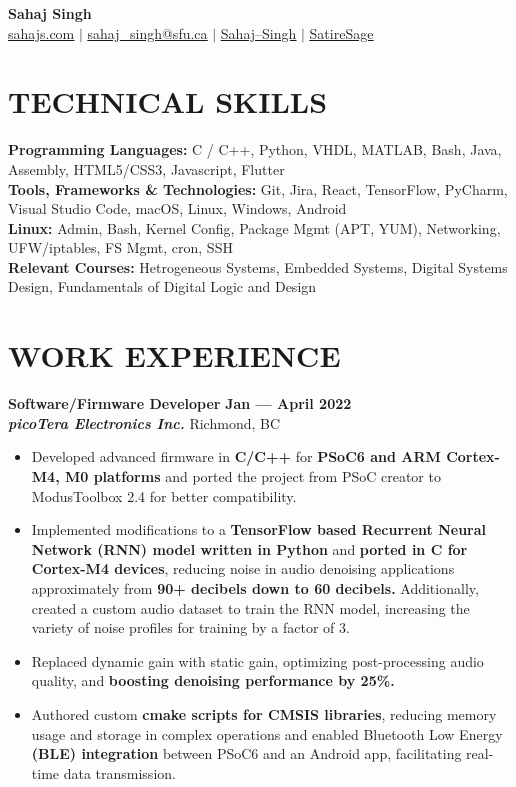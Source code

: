 \documentclass[letterpaper,11pt]{article}
\newcommand{\contact} [5] {
    \begin{center}
        \textbf{\color{colorValue}\Huge #1} \\ \vspace{1pt}
        \small \href{https://#2}{\faIcon{code} \underline{#2}} $|$ \href{mailto:#3}{\faIcon{envelope} \underline{#3}} $|$ 
        \href{#4}{\faIcon{linkedin} \underline{Sahaj--Singh}} $|$
        \href{#5}{\faIcon{github} \underline{SatireSage}}
    \end{center}
}
\newcommand{\Item} [1] {
    \item\small{{#1 \vspace{-2pt}}}
}
\newcommand{\employer} [5] {
    {\textbf{#3} \hfill \textbf{#4 --- #5}\\ \textbf{\emph{#1}} \hfill #2\\}
}
\newcommand{\workItemListStart} [0] {
    \vspace{-1pt}
    \begin{itemize}[topsep=0pt,itemsep=-2pt]
}
\newcommand{\workItemListEnd} [0] {
    \end{itemize}
    \vspace{1pt}
}
\begin{document}
    \vspace*{-30pt}

    \contact{Sahaj Singh}{sahajs.com}{sahaj\_singh@sfu.ca}{https://www.linkedin.com/in/sahaj--singh/}{https://github.com/SatireSage}

    \section{TECHNICAL SKILLS}
    \begin{itemize}[leftmargin=0in, label={}]
    \small{\item{
        \textbf{Programming Languages:}{ C / C++, Python, VHDL, MATLAB, Bash, Java, Assembly, HTML5/CSS3, Javascript, Flutter} \\
        \textbf{Tools, Frameworks \& Technologies:}{ Git, Jira, React, TensorFlow, PyCharm, Visual Studio Code, macOS, Linux, Windows, Android} \\
        \textbf{Linux:}{ Admin, Bash, Kernel Config, Package Mgmt (APT, YUM), Networking, UFW/iptables, FS Mgmt, cron, SSH} \\
        \textbf{Relevant Courses:}{ Hetrogeneous Systems, Embedded Systems, Digital Systems Design, Fundamentals of Digital Logic and Design} \\
    }}
    \end{itemize}

    \section{WORK EXPERIENCE}
    \employer{picoTera Electronics Inc.}{Richmond, BC}{Software/Firmware Developer}{Jan}{April 2022}
    \workItemListStart{}
        \Item{Developed advanced firmware in \textbf{C/C++} for \textbf{PSoC6 and ARM Cortex-M4, M0 platforms} and ported the project from PSoC creator to ModusToolbox 2.4 for better compatibility.}
        \Item{Implemented modifications to a \textbf{TensorFlow based Recurrent Neural Network (RNN) model written in Python} and \textbf{ported in C for Cortex-M4 devices}, reducing noise in audio denoising applications approximately from \textbf{90+ decibels down to 60 decibels.} Additionally, created a custom audio dataset to train the RNN model, increasing the variety of noise profiles for training by a factor of 3.}
        \Item{Replaced dynamic gain with static gain, optimizing post-processing audio quality, and \textbf{boosting denoising performance by 25\%.}}
        \Item{Authored custom \textbf{cmake scripts for CMSIS libraries}, reducing memory usage and storage in complex operations and enabled Bluetooth Low Energy \textbf{(BLE) integration} between PSoC6 and an Android app, facilitating real-time data transmission.}
    \workItemListEnd{}
\end{document}
